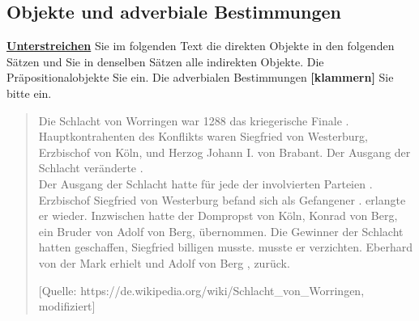 \documentclass[12pt,a4paper,twoside]{article}
\begin{document}
\newpage

\subsection{\syntaxaufgabe Objekte und adverbiale Bestimmungen}

\textbf{\ul{Unterstreichen}} Sie im folgenden Text die direkten Objekte in den folgenden Sätzen und \textbf{} Sie in denselben Sätzen alle indirekten Objekte. Die Präpositionalobjekte \textbf{} Sie ein.
Die adverbialen Bestimmungen \textbf{[klammern]} Sie bitte ein.

\vspace{-1\baselineskip}

\begin{quote}
  \begin{spread}
    Die Schlacht von Worringen war 1288 das kriegerische Finale .
  Hauptkontrahenten des Konflikts waren Siegfried von Westerburg, Erzbischof von Köln, und Herzog Johann I. von Brabant.
  Der Ausgang der Schlacht veränderte .\\
  Der Ausgang der Schlacht hatte für jede der involvierten Parteien .
  Erzbischof Siegfried von Westerburg befand sich als Gefangener  .
   erlangte er  wieder.
  Inzwischen hatte der Dompropst von {\tiny Köln}, Konrad von Berg, ein Bruder von Adolf von Berg,  übernommen.
  Die Gewinner der Schlacht hatten  geschaffen,  Siegfried    billigen musste.
   musste er  verzichten.
  Eberhard von der Mark erhielt  und Adolf von Berg , zurück.

  \footnotesize{[Quelle: https://de.wikipedia.org/wiki/Schlacht\_von\_Worringen, modifiziert]}
  \end{spread}
\end{quote}


\newpage
\end{document}
